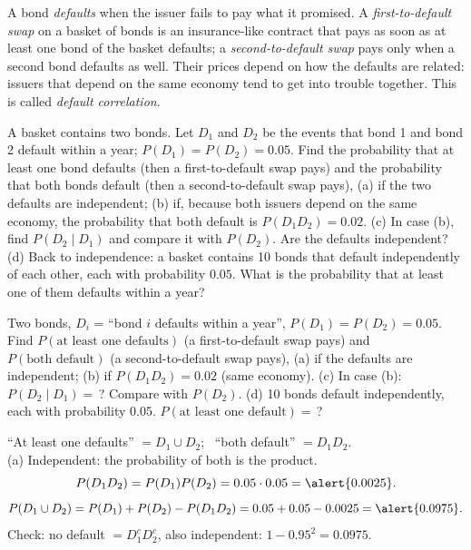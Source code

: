 
\begin{problem}
	\begin{context}
		A bond \emph{defaults} when the issuer fails to pay what it promised. A
		\emph{first-to-default swap} on a basket of bonds is an insurance-like
		contract that pays as soon as at least one bond of the basket defaults;
		a \emph{second-to-default swap} pays only when a second bond defaults as
		well. Their prices depend on how the defaults are related: issuers that
		depend on the same economy tend to get into trouble together. This is
		called \emph{default correlation}.
	\end{context}
	A basket contains two bonds. Let $D_1$ and $D_2$ be the events that bond 1
	and bond 2 default within a year; $P(D_1)=P(D_2)=0.05$. Find the
	probability that at least one bond defaults (then a first-to-default swap
	pays) and the probability that both bonds default (then a
	second-to-default swap pays),
	(a) if the two defaults are independent;
	(b) if, because both issuers depend on the same economy, the probability
	that both default is $P(D_1D_2)=0.02$.
	(c) In case (b), find $P(D_2\mid D_1)$ and compare it with $P(D_2)$. Are
	the defaults independent?
	(d) Back to independence: a basket contains 10 bonds that default
	independently of each other, each with probability $0.05$. What is the
	probability that at least one of them defaults within a year?
\end{problem}

\begin{slideproblem}
	Two bonds, $D_i$ = ``bond $i$ defaults within a year'',
	$P(D_1)=P(D_2)=0.05$. Find $P(\text{at least one defaults})$ (a
	first-to-default swap pays) and $P(\text{both default})$ (a
	second-to-default swap pays),
	(a) if the defaults are independent;
	(b) if $P(D_1D_2)=0.02$ (same economy).
	(c) In case (b): $P(D_2\mid D_1)=\,$? Compare with $P(D_2)$.
	(d) 10 bonds default independently, each with probability $0.05$.
	$P(\text{at least one default})=\,$?
\end{slideproblem}

\begin{slides}
	\small
	\exstatement
	\pause
	\sol ``At least one defaults'' $=D_1\cup D_2$; \ ``both default''
	$=D_1D_2$.
	\pause\\[1mm]
	(a) Independent: the probability of both is the product.
	\[ P(D_1D_2)=P(D_1)P(D_2)=0.05\cdot0.05=\alert{0.0025}. \]
	\pause
	\vspace{-2mm}
	\[ P(D_1\cup D_2)=P(D_1)+P(D_2)-P(D_1D_2)=0.05+0.05-0.0025
		=\alert{0.0975}. \]
	\pause
	Check: no default $=D_1^cD_2^c$, also independent:
	$1-0.95^2=0.0975$.
\end{slides}

